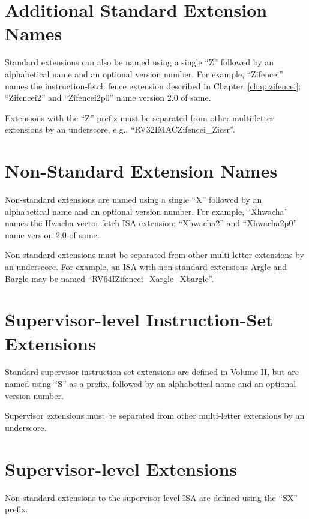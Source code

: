 \section{Additional Standard Extension Names}

Standard extensions can also be named using a single ``Z'' followed by an
alphabetical name and an optional version number.  For example,
``Zifencei'' names the instruction-fetch fence extension described in
Chapter~\ref{chap:zifencei}; ``Zifencei2'' and ``Zifencei2p0'' name version
2.0 of same.

Extensions with the ``Z'' prefix must be separated
from other multi-letter extensions by an underscore, e.g.,
``RV32IMACZifencei\_Zicsr''.

\section{Non-Standard Extension Names}

Non-standard extensions are named using a single ``X'' followed by an
alphabetical name and an optional version number.
For example, ``Xhwacha'' names the Hwacha vector-fetch ISA extension;
``Xhwacha2'' and ``Xhwacha2p0'' name version 2.0 of same.

Non-standard extensions must be separated from other multi-letter extensions
by an underscore.  For example, an ISA with non-standard extensions
Argle and Bargle may be named ``RV64IZifencei\_Xargle\_Xbargle''.

\section{Supervisor-level Instruction-Set Extensions}
Standard supervisor instruction-set extensions are defined in Volume II, but
are named using ``S'' as a prefix, followed by an
alphabetical name and an optional version number.

Supervisor extensions must be separated from other multi-letter extensions
by an underscore.

\section{Supervisor-level Extensions}
Non-standard extensions to the supervisor-level ISA are defined using
the ``SX'' prefix.

